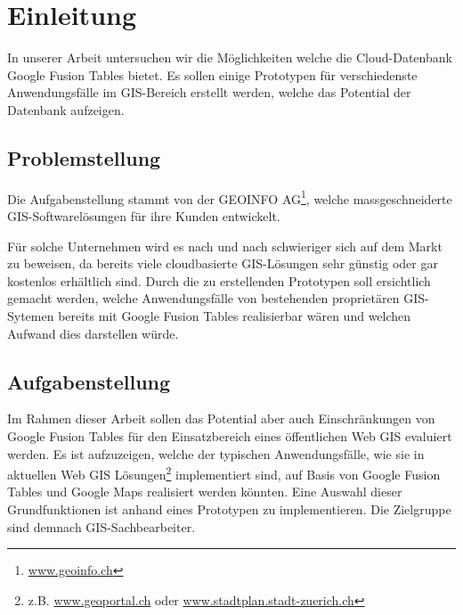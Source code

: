 \chapter{Einleitung}
\label{einleitung}
In unserer Arbeit untersuchen wir die Möglichkeiten welche die \gls{Cloud}-Datenbank Google Fusion Tables bietet. Es sollen einige Prototypen für verschiedenste Anwendungsfälle im \gls{GIS}-Bereich erstellt werden, welche das Potential der Datenbank aufzeigen.

\section{Problemstellung}
Die Aufgabenstellung stammt von der GEOINFO AG\footnote{\url{www.geoinfo.ch}}, welche massgeschneiderte \gls{GIS}-Softwarelösungen für ihre Kunden entwickelt.

Für solche Unternehmen wird es nach und nach schwieriger sich auf dem Markt zu beweisen, da bereits viele cloudbasierte \gls{GIS}-Lösungen sehr günstig oder gar kostenlos erhältlich sind. Durch die zu erstellenden Prototypen soll ersichtlich gemacht werden, welche Anwendungsfälle von bestehenden proprietären \gls{GIS}-Sytemen bereits mit Google Fusion Tables realisierbar wären und welchen Aufwand dies darstellen würde.

\section{Aufgabenstellung}
Im Rahmen dieser Arbeit sollen das Potential aber auch Einschränkungen von Google Fusion Tables für den Einsatzbereich eines öffentlichen Web \gls{GIS} evaluiert werden. Es ist aufzuzeigen, welche der typischen Anwendungsfälle, wie sie in aktuellen Web GIS Lösungen\footnote{z.B. \url{www.geoportal.ch} oder \url{www.stadtplan.stadt-zuerich.ch}} implementiert sind, auf Basis von Google Fusion Tables und Google Maps realisiert werden könnten. Eine Auswahl dieser Grundfunktionen ist anhand eines Prototypen zu implementieren. Die Zielgruppe sind demnach \gls{GIS}-Sachbearbeiter.

